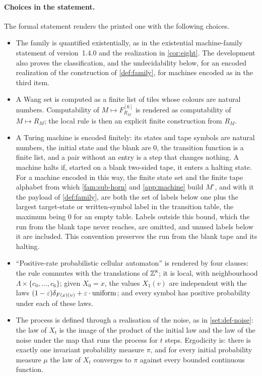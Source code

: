 \paragraph{Choices in the statement.} The formal statement renders the printed one with the following choices.
\begin{itemize}
\item The family is quantified existentially, as in the existential machine-family statement of version~1.4.0 and the realization in \cref{cor:eight}. The development also proves the classification, and the undecidability below, for an encoded realization of the construction of \cref{def:family}, for machines encoded as in the third item.
\item A Wang set is computed as a finite list of tiles whose colours are natural numbers. Computability of $M\mapsto F^{[6]}_{R_M}$ is rendered as computability of $M\mapsto R_M$; the local rule is then an explicit finite construction from $R_M$.
\item A Turing machine is encoded finitely: its states and tape symbols are natural numbers, the initial state and the blank are $0$, the transition function is a finite list, and a pair without an entry is a step that changes nothing. A machine halts if, started on a blank two-sided tape, it enters a halting state. For a machine encoded in this way, the finite state set and the finite tape alphabet from which \cref{fam:sub-horn} and \cref{app:machine} build $M^\circ$, and with it the payload of \cref{def:family}, are both the set of labels below one plus the largest target-state or written-symbol label in the transition table, the maximum being $0$ for an empty table. Labels outside this bound, which the run from the blank tape never reaches, are omitted, and unused labels below it are included. This convention preserves the run from the blank tape and its halting.
\item ``Positive-rate probabilistic cellular automaton'' is rendered by four clauses: the rule commutes with the translations of $\mathbb{Z}^8$; it is local, with neighbourhood $\Lambda\times\{c_0,\dots,c_6\}$; given $X_0=x$, the values $X_1(v)$ are independent with the laws $(1-\varepsilon)\delta_{F(x)(v)}+\varepsilon\cdot\text{uniform}$; and every symbol has positive probability under each of these laws.
\item The process is defined through a realisation of the noise, as in \cref{set:def-noise}: the law of $X_t$ is the image of the product of the initial law and the law of the noise under the map that runs the process for $t$ steps. Ergodicity is: there is exactly one invariant probability measure $\pi$, and for every initial probability measure $\mu$ the law of $X_t$ converges to $\pi$ against every bounded continuous function.

\end{itemize}
